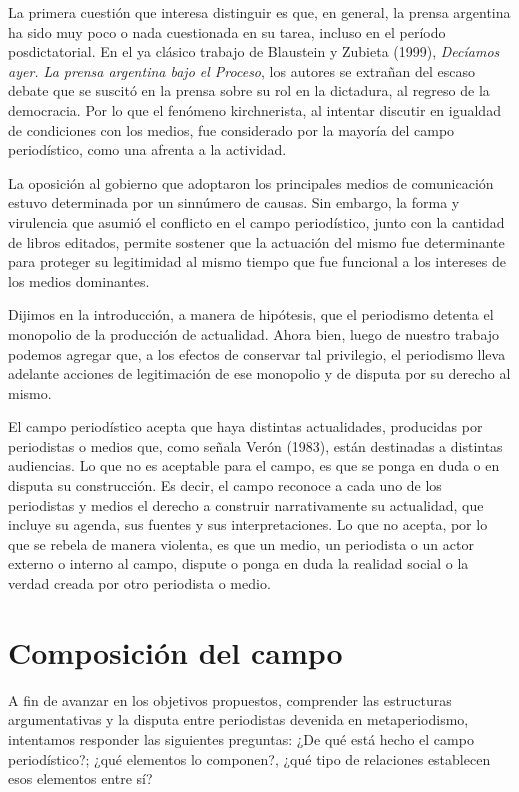 La primera cuestión que interesa distinguir es que, en general, la prensa argentina ha sido muy poco o nada cuestionada en su tarea, incluso en el período posdictatorial. En el ya clásico trabajo de Blaustein y Zubieta (1999), \emph{Decíamos ayer. La prensa argentina bajo el Proceso}, los autores se extrañan del escaso debate que se suscitó en la prensa sobre su rol en la dictadura, al regreso de la democracia. Por lo que el fenómeno kirchnerista, al intentar discutir en igualdad de condiciones con los medios, fue considerado por la mayoría del campo periodístico, como una afrenta a la actividad.

La oposición al gobierno que adoptaron los principales medios de comunicación estuvo determinada por un sinnúmero de causas. Sin embargo, la forma y virulencia que asumió el conflicto en el campo periodístico, junto con la cantidad de libros editados, permite sostener que la actuación del mismo fue determinante para proteger su legitimidad al mismo tiempo que fue funcional a los intereses de los medios dominantes.

Dijimos en la introducción, a manera de hipótesis, que el periodismo detenta el monopolio de la producción de actualidad. Ahora bien, luego de nuestro trabajo podemos agregar que, a los efectos de conservar tal privilegio, el periodismo lleva adelante acciones de legitimación de ese monopolio y de disputa por su derecho al mismo.

El campo periodístico acepta que haya distintas actualidades, producidas por periodistas o medios que, como señala Verón (1983), están destinadas a distintas audiencias. Lo que no es aceptable para el campo, es que se ponga en duda o en disputa su construcción. Es decir, el campo reconoce a cada uno de los periodistas y medios el derecho a construir narrativamente su actualidad, que incluye su agenda, sus fuentes y sus interpretaciones. Lo que no acepta, por lo que se rebela de manera violenta, es que un medio, un periodista o un actor externo o interno al campo, dispute o ponga en duda la realidad social o la verdad creada por otro periodista o medio.


\section{Composición del campo}

A fin de avanzar en los objetivos propuestos, comprender las estructuras argumentativas y la disputa entre periodistas devenida en metaperiodismo, intentamos responder las siguientes preguntas: ¿De qué está hecho el campo periodístico?; ¿qué elementos lo componen?, ¿qué tipo de relaciones establecen esos elementos entre sí?

